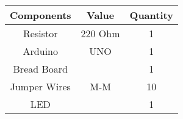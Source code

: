 \begin{tabular}{|c|c|c|}
\hline
Components & Value & Quantity\\
\hline
Resistor & 220 Ohm & 1\\
\hline
Arduino & UNO & 1\\
\hline
Bread Board & & 1\\
\hline
Jumper Wires & M-M & 10\\
\hline
LED & & 1\\
\hline
\end{tabular}
